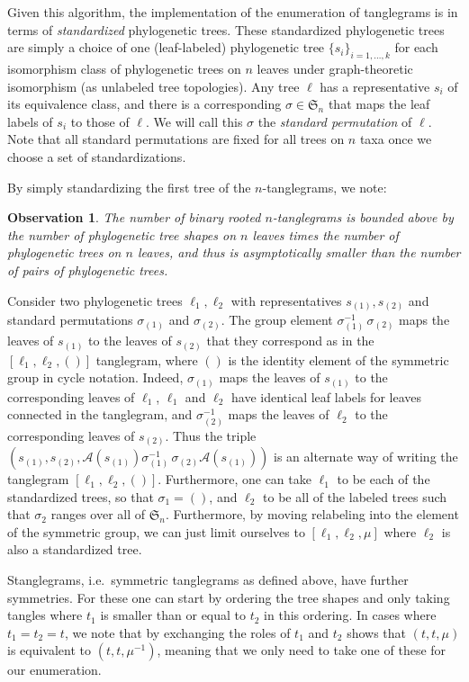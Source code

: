 \documentclass{amsart}
\newtheorem{observation}{Observation}
\newcommand{\fS}{\mathfrak S}
\newcommand{\aut}{\mathcal A}
\newcommand{\pairing}{\mu}
\newcommand{\id}{()}
\begin{document}
Given this algorithm, the implementation of the enumeration of tanglegrams is in terms of \emph{standardized} phylogenetic trees.
These standardized phylogenetic trees are simply a choice of one (leaf-labeled) phylogenetic tree $\{s_i\}_{i=1,\ldots,k}$ for each isomorphism class of phylogenetic trees on $n$ leaves under graph-theoretic isomorphism (as unlabeled tree topologies).
Any tree $\ell$ has a representative $s_i$ of its equivalence class, and there is a corresponding $\sigma \in \fS_n$ that maps the leaf labels of $s_i$ to those of $\ell$.
We will call this $\sigma$ the \emph{standard permutation} of $\ell$.
Note that all standard permutations are fixed for all trees on $n$ taxa once we choose a set of standardizations.

By simply standardizing the first tree of the $n$-tanglegrams, we note:
\begin{observation}
\label{obs:count}
The number of binary rooted $n$-tanglegrams is bounded above by the number of phylogenetic tree shapes on $n$ leaves times the number of phylogenetic trees on $n$ leaves, and thus is asymptotically smaller than the number of pairs of phylogenetic trees.
\end{observation}

Consider two phylogenetic trees $\ell_1, \ell_2$ with representatives $s_{(1)}, s_{(2)}$ and standard permutations $\sigma_{(1)}$ and $\sigma_{(2)}$.
The group element $\sigma_{(1)}^{-1} \, \sigma_{(2)}$ maps the leaves of $s_{(1)}$ to the leaves of $s_{(2)}$ that they correspond as in the $[\ell_1, \ell_2, \id]$ tanglegram, where $\id$ is the identity element of the symmetric group in cycle notation.
Indeed, $\sigma_{(1)}$ maps the leaves of $s_{(1)}$ to the corresponding leaves of $\ell_1$, $\ell_1$ and $\ell_2$ have identical leaf labels for leaves connected in the tanglegram, and $\sigma_{(2)}^{-1}$ maps the leaves of $\ell_2$ to the corresponding leaves of $s_{(2)}$.
Thus the triple $(s_{(1)}, s_{(2)}, \aut(s_{(1)}) \sigma_{(1)}^{-1} \, \sigma_{(2)} \aut(s_{(1)}))$ is an alternate way of writing the tanglegram $[\ell_1, \ell_2, \id]$.
Furthermore, one can take $\ell_1$ to be each of the standardized trees, so that $\sigma_1 = \id$, and $\ell_2$ to be all of the labeled trees such that $\sigma_2$ ranges over all of $\fS_n$.
Furthermore, by moving relabeling into the element of the symmetric group, we can just limit ourselves to $[\ell_1, \ell_2, \pairing]$ where $\ell_2$ is also a standardized tree.

Stanglegrams, i.e.\ symmetric tanglegrams as defined above, have further symmetries.
For these one can start by ordering the tree shapes and only taking tangles where $t_1$ is smaller than or equal to $t_2$ in this ordering.
In cases where $t_1 = t_2 = t$, we note that by exchanging the roles of $t_1$ and $t_2$ shows that $(t, t, \mu)$ is equivalent to $(t, t, \mu^{-1})$, meaning that we only need to take one of these for our enumeration.
\end{document}

